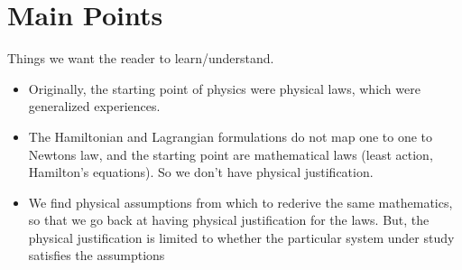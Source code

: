 \documentclass{article}
\begin{document}
\section{Main Points}
Things we want the reader to learn/understand.


\begin{itemize}
\item Originally, the starting point of physics were physical laws, which were generalized experiences.

\item The Hamiltonian and Lagrangian formulations do not map one to one to Newtons law, and the starting point are mathematical laws (least action, Hamilton's equations). So we don't have physical justification.

\item We find physical assumptions from which to rederive the same mathematics, so that we go back at having physical justification for the laws. But, the physical justification is limited to whether the particular system under study satisfies the assumptions


\end{itemize}
\end{document}
